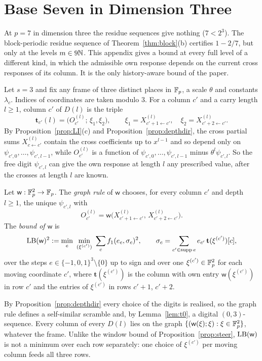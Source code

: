 %
%
\section{Base Seven in Dimension Three}\label{app:p7}
At $p=7$ in dimension three the residue sequences give nothing ($7<2^3$). The block-periodic residue sequence of Theorem~\ref{thm:block}(b) certifies $1-2/7$, but only at the levels $m\in9\mathbb{N}$. This appendix gives a bound at every full level of a different kind, in which the admissible own response depends on the current cross responses of its column. It is the only history-aware bound of the paper.

Let $s=3$ and fix any frame of three distinct places in $\mathbb{F}_p$, a scale $\theta$ and constants $\lambda_c$. Indices of coordinates are taken modulo $3$. For a column $c'$ and a carry length $l\ge1$, column $c'$ of $D(l)$ is the triple
\[
\mathbf t_{c'}(l)=\bigl(O^{(l)}_{c'};\,\xi_1,\xi_2\bigr),\qquad \xi_1=X^{(l)}_{c'+1\leftarrow c'},\quad \xi_2=X^{(l)}_{c'+2\leftarrow c'}.
\]
By Proposition~\ref{prop:LI}(c) and Proposition~\ref{prop:depthdir}, the cross partial sums $X^{(l)}_{c\leftarrow c'}$ contain the cross coefficients up to $x^{l-1}$ and so depend only on $\psi_{c',0},\dots,\psi_{c',l-1}$, while $O^{(l)}_{c'}$ is a function of $\psi_{c',0},\dots,\psi_{c',l-1}$ minus $\theta^l\psi_{c',l}$. So the free digit $\psi_{c',l}$ can give the own response at length $l$ any prescribed value, after the crosses at length $l$ are known.

\begin{definition}\label{def:graphrule}
Let $\mathsf w:\mathbb{F}_p^2\to\mathbb{F}_p$. The \emph{graph rule} of $\mathsf w$ chooses, for every column $c'$ and depth $l\ge1$, the unique $\psi_{c',l}$ with
\[
O^{(l)}_{c'}=\mathsf w\bigl(X^{(l)}_{c'+1\leftarrow c'},\,X^{(l)}_{c'+2\leftarrow c'}\bigr).
\]
The \emph{bound of $\mathsf w$} is
\[
\LB(\mathsf w)^2:=\min_e\ \min_{(\xi^{(c')})}\ \sum_c f_1(e_c,\sigma_c)^2,\qquad \sigma_c=\sum_{c'\in\operatorname{supp}e}e_{c'}\,\mathbf t(\xi^{(c')})[c],
\]
over the steps $e\in\{-1,0,1\}^3\setminus\{0\}$ up to sign and over one $\xi^{(c')}\in\mathbb{F}_p^2$ for each moving coordinate $c'$, where $\mathbf t(\xi^{(c')})$ is the column with own entry $\mathsf w(\xi^{(c')})$ in row $c'$ and the entries of $\xi^{(c')}$ in rows $c'+1$, $c'+2$.
\end{definition}

By Proposition~\ref{prop:depthdir} every choice of the digits is realised, so the graph rule defines a self-similar scramble and, by Lemma~\ref{lem:t0}, a digital $(0,3)$-sequence. Every column of every $D(l)$ lies on the graph $\{(\mathsf w(\xi);\xi):\xi\in\mathbb{F}_p^2\}$, whatever the frame. Unlike the window bound of Proposition~\ref{prop:steer}, $\mathrm{LB}(\mathsf w)$ is not a minimum over each row separately: one choice of $\xi^{(c')}$ per moving column feeds all three rows.

